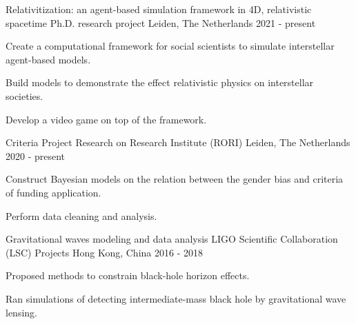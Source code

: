

\begin{cventries}

  \cventry
    {Relativitization: an agent-based simulation framework in 4D, relativistic spacetime} %
    {Ph.D. research project} %
    {Leiden, The Netherlands} %
    {2021 - present} %
    {
      \begin{cvitems} %
        \item {Create a computational framework for social scientists to simulate interstellar agent-based models.}
        \item {Build models to demonstrate the effect relativistic physics on interstellar societies.}
        \item {Develop a video game on top of the framework.}
      \end{cvitems}
    }

  \cventry
    {Criteria Project} %
    {Research on Research Institute (RORI)} %
    {Leiden, The Netherlands} %
    {2020 - present} %
    {
      \begin{cvitems} %
        \item {Construct Bayesian models on the relation between the gender bias and criteria of funding application.}
        \item {Perform data cleaning and analysis.}
      \end{cvitems}
    }

  \cventry
    {Gravitational waves modeling and data analysis} %
    {LIGO Scientific Collaboration (LSC) Projects} %
    {Hong Kong, China} %
    {2016 - 2018} %
    {
      \begin{cvitems} %
        \item {Proposed methods to constrain black-hole horizon effects.}
        \item {Ran simulations of detecting intermediate-mass black hole by gravitational wave lensing.}
      \end{cvitems}
    }


\end{cventries}
